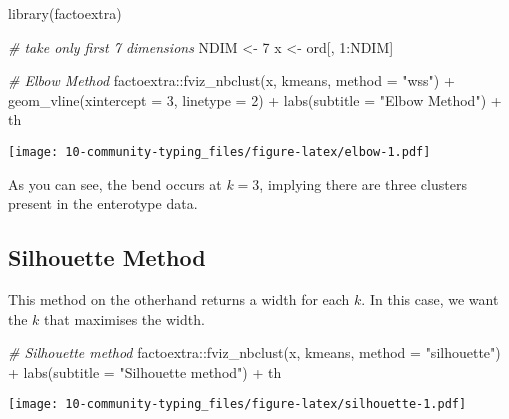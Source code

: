 \documentclass[
  oneside]{book}
\newenvironment{Shaded}{\begin{snugshade}}{\end{snugshade}}
\newcommand{\AttributeTok}[1]{\textcolor[rgb]{0.77,0.63,0.00}{#1}}
\newcommand{\CommentTok}[1]{\textcolor[rgb]{0.56,0.35,0.01}{\textit{#1}}}
\newcommand{\DecValTok}[1]{\textcolor[rgb]{0.00,0.00,0.81}{#1}}
\newcommand{\FunctionTok}[1]{\textcolor[rgb]{0.00,0.00,0.00}{#1}}
\newcommand{\NormalTok}[1]{#1}
\newcommand{\OtherTok}[1]{\textcolor[rgb]{0.56,0.35,0.01}{#1}}
\newcommand{\SpecialCharTok}[1]{\textcolor[rgb]{0.00,0.00,0.00}{#1}}
\newcommand{\StringTok}[1]{\textcolor[rgb]{0.31,0.60,0.02}{#1}}
\begin{document}
\begin{Shaded}
\begin{Highlighting}[]
\FunctionTok{library}\NormalTok{(factoextra)}

\CommentTok{\# take only first 7 dimensions}
\NormalTok{NDIM }\OtherTok{\textless{}{-}} \DecValTok{7}
\NormalTok{x    }\OtherTok{\textless{}{-}}\NormalTok{ ord[, }\DecValTok{1}\SpecialCharTok{:}\NormalTok{NDIM]}

\CommentTok{\# Elbow Method}
\NormalTok{factoextra}\SpecialCharTok{::}\FunctionTok{fviz\_nbclust}\NormalTok{(x, kmeans, }\AttributeTok{method =} \StringTok{"wss"}\NormalTok{) }\SpecialCharTok{+}
                         \FunctionTok{geom\_vline}\NormalTok{(}\AttributeTok{xintercept =} \DecValTok{3}\NormalTok{, }\AttributeTok{linetype =} \DecValTok{2}\NormalTok{) }\SpecialCharTok{+}
                         \FunctionTok{labs}\NormalTok{(}\AttributeTok{subtitle =} \StringTok{"Elbow Method"}\NormalTok{) }\SpecialCharTok{+}\NormalTok{ th}
\end{Highlighting}
\end{Shaded}

\texttt{[image: 10-community-typing\_files/figure-latex/elbow-1.pdf]}

As you can see, the bend occurs at \(k=3\), implying there are three clusters present in the enterotype data.

\hypertarget{silhouette-method}{%
\subsection{Silhouette Method}\label{silhouette-method}}

This method on the otherhand returns a width for each \(k\). In this case, we want the \(k\) that maximises the width.

\begin{Shaded}
\begin{Highlighting}[]
\CommentTok{\# Silhouette method}
\NormalTok{factoextra}\SpecialCharTok{::}\FunctionTok{fviz\_nbclust}\NormalTok{(x, kmeans, }\AttributeTok{method =} \StringTok{"silhouette"}\NormalTok{) }\SpecialCharTok{+}
                         \FunctionTok{labs}\NormalTok{(}\AttributeTok{subtitle =} \StringTok{"Silhouette method"}\NormalTok{) }\SpecialCharTok{+}\NormalTok{ th}
\end{Highlighting}
\end{Shaded}

\texttt{[image: 10-community-typing\_files/figure-latex/silhouette-1.pdf]}
\end{document}
